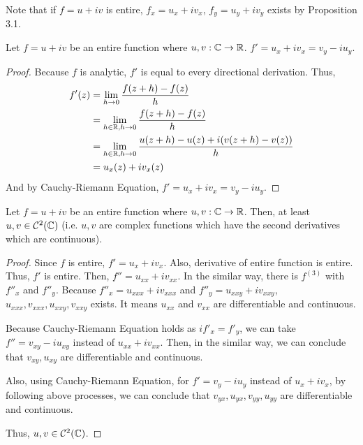 Note that if \(f = u + iv\) is entire, \(f_x = u_x + iv_x\), \(f_y = u_y + iv_y\) exists by Proposition 3.1.
\begin{lemma}\label{lem-6-exist-pd}
  Let \(f = u + iv\) be an entire function where \(u, v : \mathbb{C} \to \mathbb{R}\).
  \(f' = u_x + iv_x = v_y - iu_y\).
\end{lemma}
\begin{proof}
  Because \(f\) is analytic, \(f'\) is equal to every directional derivation.
  Thus,
  \begin{align*}
    f'(z)
    &= \lim_{h \to 0} \frac{f(z + h) - f(z)}{h}
    \\&= \lim_{h \in \mathbb{R}, h \to 0} \frac{f(z + h) - f(z)}{h}
    \\&= \lim_{h \in \mathbb{R}, h \to 0} \frac{u(z + h) - u(z) + i(v(z + h) - v(z))}{h}
    \\&= u_x(z) + iv_x(z)
  \end{align*}
  And by Cauchy-Riemann Equation, \(f' = u_x + iv_x = v_y - iu_y\).
\end{proof}
\begin{lemma}\label{lem-6-2nd-class}
  Let \(f = u + iv\) be an entire function where \(u, v : \mathbb{C} \to \mathbb{R}\).
  Then, at least \(u, v \in \mathcal{C}^2(\mathbb{C})\) (i.e. \(u, v\) are complex functions which have the second derivatives which are continuous).
\end{lemma}
\begin{proof}
  Since \(f\) is entire, \(f' = u_x + iv_x\).
  Also, derivative of entire function is entire.
  Thus, \(f'\) is entire.
  Then, \(f'' = u_{xx} + iv_{xx}\).
  In the similar way, there is \(f^{(3)}\) with \(f''_x\) and \(f''_y\).
  Because \(f''_x = u_{xxx} + iv_{xxx}\) and \(f''_y = u_{xxy} + iv_{xxy}\),
  \(u_{xxx}, v_{xxx}, u_{xxy}, v_{xxy}\) exists.
  It means \(u_{xx}\) and \(v_{xx}\) are differentiable and continuous.

  Because Cauchy-Riemann Equation holds as \(if'_x = f'_y\),
  we can take \(f'' = v_{xy} - iu_{xy}\) instead of \(u_{xx} + iv_{xx}\).
  Then, in the similar way, we can conclude that \(v_{xy}, u_{xy}\) are differentiable and continuous.
  
  Also, using Cauchy-Riemann Equation,
  for \(f' = v_y - iu_y\) instead of \(u_x + iv_x\),
  by following above processes, we can conclude that
  \(v_{yx}, u_{yx}, v_{yy}, u_{yy}\) are differentiable and continuous.

  Thus, \(u, v \in \mathcal{C}^{2}(\mathbb{C})\).
\end{proof}

